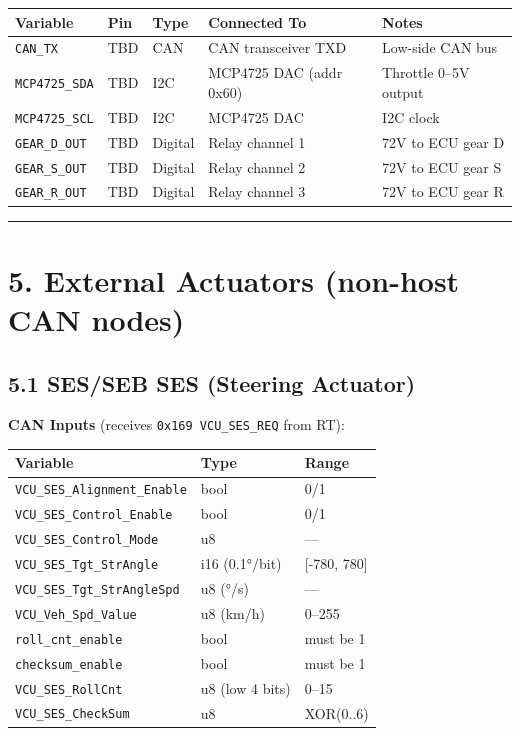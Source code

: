 \documentclass[12pt,a4paper,oneside]{report}
\begin{document}
\begin{longtable}[]{@{}lllll@{}}
\toprule\noalign{}
Variable & Pin & Type & Connected To & Notes \\
\midrule\noalign{}
\endhead
\bottomrule\noalign{}
\endlastfoot
\texttt{CAN\_TX} & TBD & CAN & CAN transceiver TXD & Low-side CAN bus \\
\texttt{MCP4725\_SDA} & TBD & I2C & MCP4725 DAC (addr 0x60) & Throttle 0--5V
output \\
\texttt{MCP4725\_SCL} & TBD & I2C & MCP4725 DAC & I2C clock \\
\texttt{GEAR\_D\_OUT} & TBD & Digital & Relay channel 1 & 72V to ECU gear D \\
\texttt{GEAR\_S\_OUT} & TBD & Digital & Relay channel 2 & 72V to ECU gear S \\
\texttt{GEAR\_R\_OUT} & TBD & Digital & Relay channel 3 & 72V to ECU gear R \\
\end{longtable}

\begin{center}\rule{0.5\linewidth}{0.5pt}\end{center}

\section{5. External Actuators (non-host CAN
nodes)}\label{external-actuators-non-host-can-nodes}

\subsection{5.1 SES/SEB SES (Steering
Actuator)}\label{SES/SEB-SES-steering-actuator}

\textbf{CAN Inputs} (receives \texttt{0x169\ VCU\_SES\_REQ} from RT):

\begin{longtable}[]{@{}lll@{}}
\toprule\noalign{}
Variable & Type & Range \\
\midrule\noalign{}
\endhead
\bottomrule\noalign{}
\endlastfoot
\texttt{VCU\_SES\_Alignment\_Enable} & bool & 0/1 \\
\texttt{VCU\_SES\_Control\_Enable} & bool & 0/1 \\
\texttt{VCU\_SES\_Control\_Mode} & u8 & --- \\
\texttt{VCU\_SES\_Tgt\_StrAngle} & i16 (0.1°/bit) & {[}-780, 780{]} \\
\texttt{VCU\_SES\_Tgt\_StrAngleSpd} & u8 (°/s) & --- \\
\texttt{VCU\_Veh\_Spd\_Value} & u8 (km/h) & 0--255 \\
\texttt{roll\_cnt\_enable} & bool & must be 1 \\
\texttt{checksum\_enable} & bool & must be 1 \\
\texttt{VCU\_SES\_RollCnt} & u8 (low 4 bits) & 0--15 \\
\texttt{VCU\_SES\_CheckSum} & u8 & XOR(0..6) \\
\end{longtable}
\end{document}
